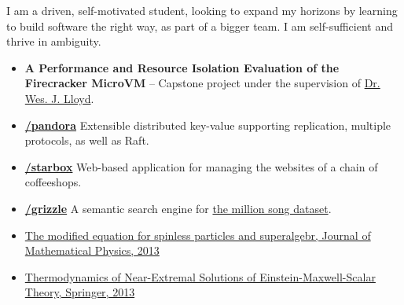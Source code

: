 

\begin{flushleft}
\justifying
I am a driven, self-motivated student, looking to expand my horizons by learning to build
software the right way, as part of a bigger team. I am self-sufficient and thrive in ambiguity.

\end{flushleft}


\small
{}


\begin{itemize}
    \item \justifying \textbf{A Performance and Resource Isolation Evaluation of the Firecracker MicroVM} -- Capstone project under the supervision of \href{http://faculty.washington.edu/wlloyd/}{Dr. Wes. J. Lloyd}.
    \item \justifying \href{https://github.com/zsadeghi/pandora}{\githubsymbol \textbf{/pandora}} Extensible distributed key-value supporting replication, multiple protocols, as well as Raft. 
    \item \justifying \href{https://github.com/zsadeghi/starbox}{\githubsymbol \textbf{/starbox}} Web-based application for managing the websites of a chain of coffeeshops.
    \item \justifying \href{https://github.com/zsadeghi/grizzle}{\githubsymbol \textbf{/grizzle}} A semantic search engine for \href{http://millionsongdataset.com/}{the million song dataset}.
\end{itemize}


\begin{itemize}
    \item \href{https://dx.doi.org/10.1063/1.4823715}{The modified equation for spinless particles and superalgebr, Journal of Mathematical Physics, 2013 \externalLink}
    \item \href{https://link.springer.com/article/10.1007/s10773-013-1542-2#page-1}{Thermodynamics of Near-Extremal Solutions of Einstein-Maxwell-Scalar Theory, Springer, 2013 \externalLink}
\end{itemize}






